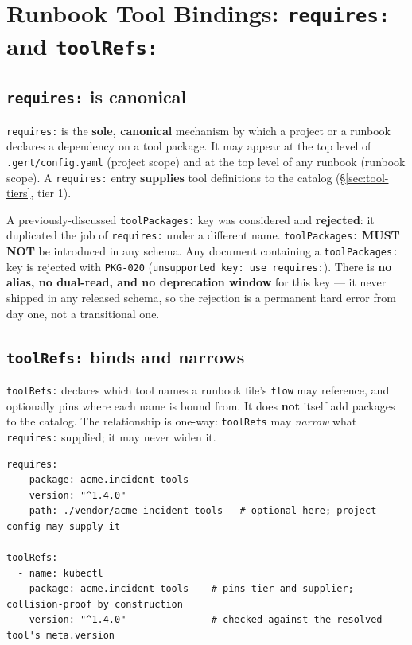 \section{Runbook Tool Bindings: \texttt{requires:} and \texttt{toolRefs:}}
\label{sec:tool-bindings}

\subsection{\texttt{requires:} is canonical}

\texttt{requires:} is the \textbf{sole, canonical} mechanism by which a
project or a runbook declares a dependency on a tool package. It may appear
at the top level of \texttt{.gert/config.yaml} (project scope) and at the top
level of any runbook (runbook scope). A \texttt{requires:} entry
\textbf{supplies} tool definitions to the catalog (\S\ref{sec:tool-tiers},
tier 1).

A previously-discussed \texttt{toolPackages:} key was considered and
\textbf{rejected}: it duplicated the job of \texttt{requires:} under a
different name. \texttt{toolPackages:} \textbf{MUST NOT} be introduced in any
schema. Any document containing a \texttt{toolPackages:} key is rejected with
\texttt{PKG-020} (\texttt{unsupported key: use requires:}). There is
\textbf{no alias, no dual-read, and no deprecation window} for this key ---
it never shipped in any released schema, so the rejection is a permanent hard
error from day one, not a transitional one.

\subsection{\texttt{toolRefs:} binds and narrows}

\texttt{toolRefs:} declares which tool names a runbook file's \texttt{flow}
may reference, and optionally pins where each name is bound from. It does
\textbf{not} itself add packages to the catalog. The relationship is
one-way: \texttt{toolRefs} may \emph{narrow} what \texttt{requires:} supplied;
it may never widen it.

\begin{verbatim}
requires:
  - package: acme.incident-tools
    version: "^1.4.0"
    path: ./vendor/acme-incident-tools   # optional here; project config may supply it

toolRefs:
  - name: kubectl
    package: acme.incident-tools    # pins tier and supplier; collision-proof by construction
    version: "^1.4.0"               # checked against the resolved tool's meta.version
\end{verbatim}

